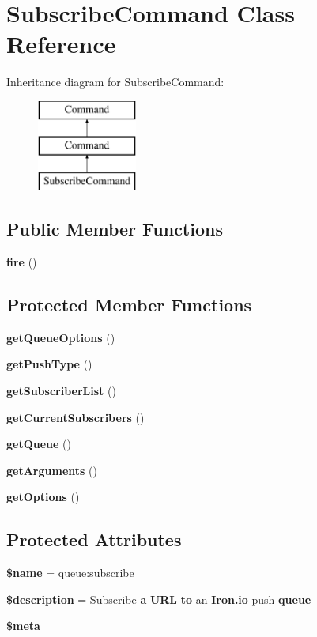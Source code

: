 \section{Subscribe\+Command Class Reference}
\label{class_illuminate_1_1_queue_1_1_console_1_1_subscribe_command}
Inheritance diagram for Subscribe\+Command\+:\begin{figure}[H]
\begin{center}
\leavevmode
\includegraphics[height=3.000000cm]{class_illuminate_1_1_queue_1_1_console_1_1_subscribe_command}
\end{center}
\end{figure}
\subsection*{Public Member Functions}
\begin{DoxyCompactItemize}
\item 
{\bf fire} ()
\end{DoxyCompactItemize}
\subsection*{Protected Member Functions}
\begin{DoxyCompactItemize}
\item 
{\bf get\+Queue\+Options} ()
\item 
{\bf get\+Push\+Type} ()
\item 
{\bf get\+Subscriber\+List} ()
\item 
{\bf get\+Current\+Subscribers} ()
\item 
{\bf get\+Queue} ()
\item 
{\bf get\+Arguments} ()
\item 
{\bf get\+Options} ()
\end{DoxyCompactItemize}
\subsection*{Protected Attributes}
\begin{DoxyCompactItemize}
\item 
{\bf \$name} = \textquotesingle{}queue\+:subscribe\textquotesingle{}
\item 
{\bf \$description} = \textquotesingle{}Subscribe {\bf a} {\bf U\+R\+L} {\bf to} an {\bf Iron.\+io} push {\bf queue}\textquotesingle{}
\item 
{\bf \$meta}
\end{DoxyCompactItemize}



